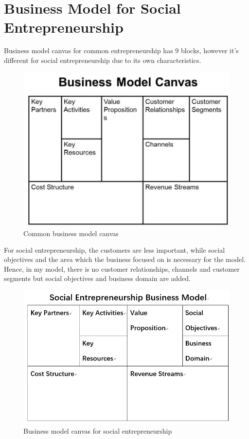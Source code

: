 \documentclass[12pt]{article}
\begin{document}
\section{Business Model for Social Entrepreneurship}
Business model canvas for common entrepreneurship has 9 blocks, however it's different for social entrepreneurship due to its own characteristics.
\begin{figure}[H]
\centering
\includegraphics[scale=0.2]{P1.png}
\caption{Common business model canvas}
\end{figure}
\par For social entrepreneurship, the customers are less important, while social objectives and the area which the business focused on is necessary for the model. Hence, in my model, there is no customer relationships, channels and customer segments but social objectives and business domain are added.
\begin{figure}[H]
\centering
\includegraphics[scale=0.4]{P2.png}
\caption{Business model canvas for social entrepreneurship}
\end{figure}
\end{document}
